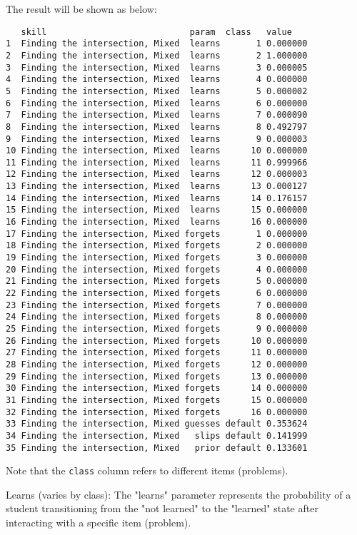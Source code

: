\documentclass{article}
\begin{document}
The result will be shown as below:

\begin{verbatim}
   skill                            param  class   value
1  Finding the intersection, Mixed  learns       1 0.000000
2  Finding the intersection, Mixed  learns       2 1.000000
3  Finding the intersection, Mixed  learns       3 0.000005
4  Finding the intersection, Mixed  learns       4 0.000000
5  Finding the intersection, Mixed  learns       5 0.000002
6  Finding the intersection, Mixed  learns       6 0.000000
7  Finding the intersection, Mixed  learns       7 0.000090
8  Finding the intersection, Mixed  learns       8 0.492797
9  Finding the intersection, Mixed  learns       9 0.000003
10 Finding the intersection, Mixed  learns      10 0.000000
11 Finding the intersection, Mixed  learns      11 0.999966
12 Finding the intersection, Mixed  learns      12 0.000003
13 Finding the intersection, Mixed  learns      13 0.000127
14 Finding the intersection, Mixed  learns      14 0.176157
15 Finding the intersection, Mixed  learns      15 0.000000
16 Finding the intersection, Mixed  learns      16 0.000000
17 Finding the intersection, Mixed forgets       1 0.000000
18 Finding the intersection, Mixed forgets       2 0.000000
19 Finding the intersection, Mixed forgets       3 0.000000
20 Finding the intersection, Mixed forgets       4 0.000000
21 Finding the intersection, Mixed forgets       5 0.000000
22 Finding the intersection, Mixed forgets       6 0.000000
23 Finding the intersection, Mixed forgets       7 0.000000
24 Finding the intersection, Mixed forgets       8 0.000000
25 Finding the intersection, Mixed forgets       9 0.000000
26 Finding the intersection, Mixed forgets      10 0.000000
27 Finding the intersection, Mixed forgets      11 0.000000
28 Finding the intersection, Mixed forgets      12 0.000000
29 Finding the intersection, Mixed forgets      13 0.000000
30 Finding the intersection, Mixed forgets      14 0.000000
31 Finding the intersection, Mixed forgets      15 0.000000
32 Finding the intersection, Mixed forgets      16 0.000000
33 Finding the intersection, Mixed guesses default 0.353624
34 Finding the intersection, Mixed   slips default 0.141999
35 Finding the intersection, Mixed   prior default 0.133601
\end{verbatim}
Note that the \texttt{class} column refers to different items (problems).

Learns (varies by class): The "learns" parameter represents the probability of a student transitioning from the "not learned" to the "learned" state after interacting with a specific item (problem).
\end{document}
